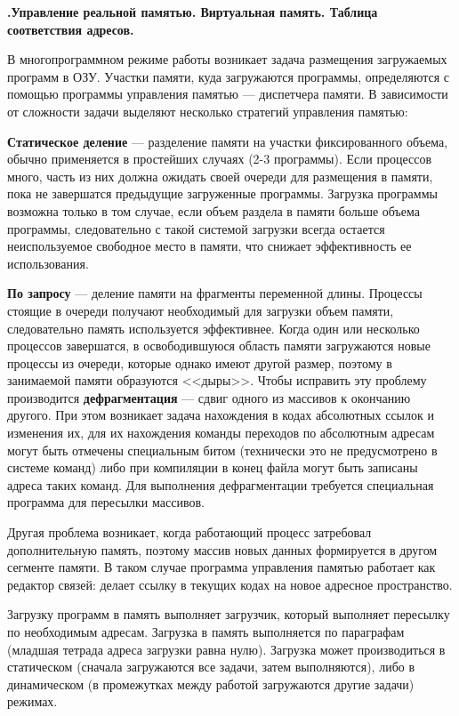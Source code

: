 \documentclass[unicode, 12pt, a4paper, oneside]{article}
\newcounter{qcnt}
\newcommand{\quest}[1]{\par\refstepcounter{qcnt}\textbf{\arabic{qcnt}.\quad #1}}
\begin{document}
\quest{Управление реальной памятью. Виртуальная память. Таблица соответствия адресов.}

В многопрограммном режиме работы возникает задача размещения загружаемых программ в ОЗУ.  Участки памяти, куда загружаются программы, определяются с помощью программы управления памятью — диспетчера памяти. В зависимости от сложности задачи выделяют несколько стратегий управления памятью:

\textbf{Статическое деление} --- разделение памяти на участки фиксированного объема, обычно применяется в простейших случаях (2-3 программы). Если процессов много, часть из них должна ожидать своей очереди для размещения в памяти, пока не завершатся предыдущие загруженные программы. Загрузка программы возможна только в том случае, если объем раздела в памяти больше объема программы, следовательно с такой системой загрузки всегда остается неиспользуемое свободное место в памяти, что снижает эффективность ее использования.

\textbf{По запросу} --- деление памяти на фрагменты переменной длины. Процессы стоящие в очереди получают необходимый для загрузки объем памяти, следовательно память используется эффективнее. Когда один или несколько процессов завершатся, в освободившуюся область памяти загружаются новые процессы из очереди, которые однако имеют другой размер, поэтому в занимаемой памяти образуются <<дыры>>. Чтобы исправить эту проблему производится \textbf{дефрагментация} --- сдвиг одного из массивов к окончанию другого. При этом возникает задача нахождения в кодах абсолютных ссылок и изменения их, для их нахождения команды переходов по абсолютным адресам могут быть отмечены специальным битом (технически это не предусмотрено в системе команд) либо при компиляции в конец файла могут быть записаны адреса таких команд. Для выполнения дефрагментации требуется специальная программа для пересылки массивов.

Другая проблема возникает, когда работающий процесс затребовал дополнительную память, поэтому массив новых данных формируется в другом сегменте памяти. В таком случае программа управления памятью работает как редактор связей: делает ссылку в текущих кодах на новое адресное пространство.

Загрузку программ в память выполняет загрузчик, который выполняет пересылку по необходимым адресам. Загрузка в память выполняется по параграфам (младшая тетрада адреса загрузки равна нулю). Загрузка может производиться в статическом (сначала загружаются все задачи, затем выполняются), либо в динамическом (в промежутках между работой загружаются другие задачи) режимах.
\end{document}
